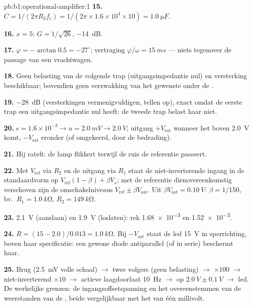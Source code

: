 \begin{solution}{pb:b1:operational-amplifier:1}
\textbf{15.} $C = 1/(2\pi R_2f_c) = 1/(2\pi \times 1.6\times10^4 \times 10)
= \qty{1.0}{\micro F}$.

\textbf{16.} $x = 5$: $G = 1/\sqrt{26}$, \qty{-14}{dB}.

\textbf{17.} $\varphi = -\arctan 0.5 = -27^\circ$; vertraging $\varphi/\omega =
\qty{15}{ms}$ --- niets tegenover de passage van een vrachtwagen.

\textbf{18.} Geen belasting van de volgende trap (uitgangsimpedantie nul)
en versterking beschikbaar; bovendien geen verzwakking van het gewenste  onder
de .

\textbf{19.} \qty{-28}{dB} (versterkingen vermenigvuldigen,  tellen
op), exact omdat de eerste trap een uitgangsimpedantie nul heeft: de
tweede trap belast haar niet.

\textbf{20.} $\epsilon = 1.6\times10^{-3} \to u = \qty{2.0}{mV} \to
\qty{2.0}{V}$; uitgang $+V_{\mathrm{sat}}$ wanneer het  boven
\qty{2.0}{V} komt, $-V_{\mathrm{sat}}$ eronder (of omgekeerd, door de bedrading).

\textbf{21.} Hij ratelt: de lamp flikkert terwijl de ruis de referentie
passeert.

\textbf{22.} Met $V_{\mathrm{ref}}$ via $R_2$ en de uitgang via
$R_1$ staat de niet-inverterende ingang in de standaardvorm op
$V_{\mathrm{ref}}(1 - \beta) + \beta V_s$; met de referentie dienovereenkomstig
verschoven zijn de omschakelniveaus $V_{\mathrm{ref}} \pm \beta V_{\mathrm{sat}}$.
Uit $\beta V_{\mathrm{sat}} = \qty{0.10}{V}$: $\beta = 1/150$, bv.\ $R_1 =
\qty{1.0}{k\ohm}$, $R_2 = \qty{149}{k\ohm}$.

\textbf{23.} \qty{2.1}{V} (aanslaan) en \qty{1.9}{V} (loslaten): rek
\num{1.68e-3} en \num{1.52e-3}.

\textbf{24.} $R = (15 - 2.0)/0.013 = \qty{1.0}{k\ohm}$. Bij
$-V_{\mathrm{sat}}$ staat de led \qty{15}{V} in sperrichting, boven haar
specificatie: een gewone diode antiparallel (of in serie) beschermt haar.

\textbf{25.} Brug (\qty{2.5}{mV} volle schaal) $\to$ twee volgers (geen
belasting) $\to$  $\times100$ $\to$ niet-inverterend
$\times10$ $\to$ actieve laagdoorlaat \qty{10}{Hz} $\to$  op
$\qty{2.0}{V} \pm \qty{0.1}{V}$ $\to$ led. De werkelijke grenzen: de
ingangsoffsetspanning en het overeenstemmen van de weerstanden van de
, beide vergelijkbaar met het  van één millivolt.
\end{solution}
